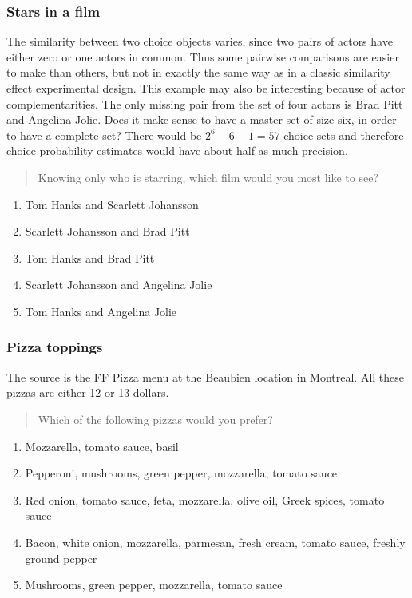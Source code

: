 \documentclass[11pt,letter]{amsart}
\begin{document}
\subsubsection{Stars in a film}

The similarity between two choice objects varies, since two pairs of actors
have either zero or one actors in common. Thus some pairwise comparisons are
easier to make than others, but not in exactly the same way as in a classic
similarity effect experimental design. This example may also be interesting
because of actor complementarities. The only missing pair from the set of
four actors is Brad Pitt and Angelina Jolie. Does it make sense to have a
master set of size six, in order to have a complete set? There would be $%
2^6-6-1=57$ choice sets and therefore choice probability estimates would
have about half as much precision.

\begin{quotation}
Knowing only who is starring, which film would you most like to see?
\end{quotation}

\begin{enumerate}
\item Tom Hanks and Scarlett Johansson 

\item Scarlett Johansson and Brad Pitt 

\item Tom Hanks and Brad Pitt 

\item Scarlett Johansson and Angelina Jolie 

\item Tom Hanks and Angelina Jolie
\end{enumerate}

\subsubsection{Pizza toppings}

The source is the FF Pizza menu at the Beaubien location in Montreal. All
these pizzas are either 12 or 13 dollars.

\begin{quotation}
Which of the following pizzas would you prefer?
\end{quotation}

\begin{enumerate}
\item Mozzarella, tomato sauce, basil 

\item Pepperoni, mushrooms, green pepper, mozzarella, tomato sauce 

\item Red onion, tomato sauce, feta, mozzarella, olive oil, Greek spices,
tomato sauce 

\item Bacon, white onion, mozzarella, parmesan, fresh cream, tomato sauce,
freshly ground pepper 

\item Mushrooms, green pepper, mozzarella, tomato sauce
\end{enumerate}
\end{document}
